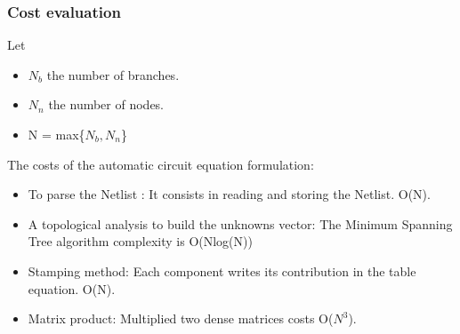 
\frame
{
\frametitle{Cost evaluation}
Let
\begin{itemize}
\item $N_{b}$ the number of branches.
\item $N_{n}$ the number of nodes.
\item N = max\{$N_{b},N_{n}$\}
\end{itemize}

\begin{block}{The costs of the automatic circuit equation formulation:}

\begin{itemize}
\item To parse the Netlist : It consists in reading and storing the Netlist. O(N).
\item A topological analysis to build the unknowns vector:
The Minimum Spanning Tree algorithm complexity is O(Nlog(N))
\item Stamping method:
Each component writes its contribution in the table equation. O(N).
\item Matrix product:
Multiplied two dense matrices costs O($N^{3}$).
\end{itemize}
\end{block}


}
